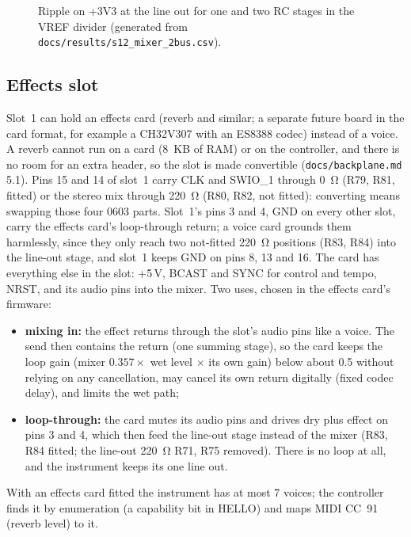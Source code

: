 \documentclass[11pt,a4paper]{article}
\newcommand{\file}[1]{\texttt{#1}}
\begin{document}
\begin{table}[htbp]
\centering\small
\caption{S12: the mixer's reference variants (\file{docs/results/s12\_mixer\_2bus.csv}); generated. Ripple
transfer to the line out in dB; ``--'': not applicable.}\label{tab:vref}

\end{table}

\begin{figure}[htbp]
\centering

\caption{Ripple on +3V3 at the line out for one and two RC stages in the VREF divider (generated from
\file{docs/results/s12\_mixer\_2bus.csv}).}\label{fig:vref}
\end{figure}

\subsection{Effects slot}\label{sec:fxslot}
Slot~1 can hold an effects card (reverb and similar; a separate future board in the card format, for example a
CH32V307 with an ES8388 codec) instead of a voice. A reverb cannot run on a card (\SI{8}{KB} of RAM) or on the
controller, and there is no room for an extra header, so the slot is made convertible
(\file{docs/backplane.md} 5.1). Pins 15 and 14 of slot~1 carry CLK and SWIO\_1 through \SI{0}{\ohm} (R79, R81,
fitted) or the stereo mix through \SI{220}{\ohm} (R80, R82, not fitted): converting means swapping those four
0603 parts. Slot~1's pins 3 and 4, GND on every other slot, carry the effects card's loop-through return; a voice
card grounds them harmlessly, since they only reach two not-fitted \SI{220}{\ohm} positions (R83, R84) into the
line-out stage, and slot~1 keeps GND on pins 8, 13 and 16. The card has everything else in the slot: +5\,V, BCAST and SYNC for control and tempo, NRST, and its
audio pins into the mixer. Two uses, chosen in the effects card's firmware:
\begin{itemize}
  \item \textbf{mixing in:} the effect returns through the slot's audio pins like a voice. The send then contains the
    return (one summing stage), so the card keeps the loop gain (mixer $0.357\times$ wet level $\times$ its own
    gain) below about 0.5 without relying on any cancellation, may cancel its own return digitally (fixed codec
    delay), and limits the wet path;
  \item \textbf{loop-through:} the card mutes its audio pins and drives dry plus effect on pins 3 and 4, which then
    feed the line-out stage instead of the mixer (R83, R84 fitted; the line-out \SI{220}{\ohm} R71, R75 removed).
    There is no loop at all, and the instrument keeps its one line out.
\end{itemize}
With an effects card fitted the instrument has at most 7 voices; the controller finds it by enumeration (a
capability bit in HELLO) and maps MIDI CC~91 (reverb level) to it.
\end{document}
